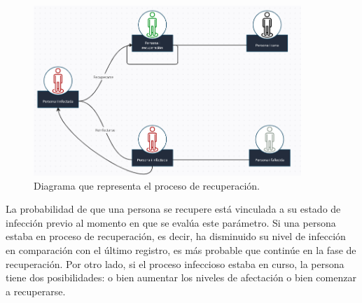 \begin{figure}[htb]
    \centering
    \includegraphics[width=0.9\textwidth]{Graphics/Diagrama_Recuperacion.png}
    \caption{Diagrama que representa el proceso de recuperación.}
\end{figure}


La probabilidad de que una persona se recupere está vinculada a su estado de infección previo al momento en 
que se evalúa este parámetro. Si una persona estaba en proceso de recuperación, es decir, ha disminuido su 
nivel de infección en comparación con el último registro, es más probable que continúe en la fase de 
recuperación. Por otro lado, si el proceso infeccioso estaba en curso, la persona tiene dos posibilidades: 
o bien aumentar los niveles de afectación o bien comenzar a recuperarse.







